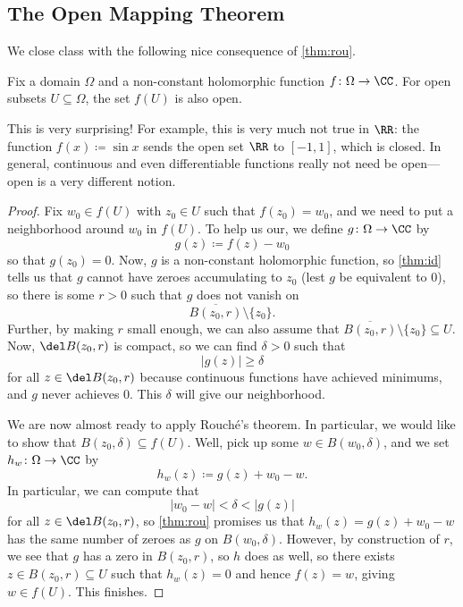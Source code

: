 \subsection{The Open Mapping Theorem}
We close class with the following nice consequence of \autoref{thm:rou}.
\begin{theorem} \label{thm:openmap}
	Fix a domain $\Omega$ and a non-constant holomorphic function $f\colon \Omega\to\CC$. For open subsets $U\subseteq\Omega$, the set $f(U)$ is also open.
\end{theorem}
This is very surprising! For example, this is very much not true in $\RR$: the function $f(x)\coloneqq \sin x$ sends the open set $\RR$ to $[-1,1]$, which is closed. In general, continuous and even differentiable functions really not need be open---open is a very different notion.
\begin{proof}
	Fix $w_0\in f(U)$ with $z_0\in U$ such that $f(z_0)=w_0$, and we need to put a neighborhood around $w_0$ in $f(U)$. To help us our, we define $g\colon \Omega\to\CC$ by
	\[g(z)\coloneqq f(z)-w_0\]
	so that $g(z_0)=0$. Now, $g$ is a non-constant holomorphic function, so \autoref{thm:id} tells us that $g$ cannot have zeroes accumulating to $z_0$ (lest $g$ be equivalent to $0$), so there is some $r>0$ such that $g$ does not vanish on
	\[\overline{B(z_0,r)}\setminus\{z_0\}.\]
	Further, by making $r$ small enough, we can also assume that $\overline{B(z_0,r)}\setminus\{z_0\}\subseteq U$. Now, $\del B(z_0,r)$ is compact, so we can find $\delta>0$ such that
	\[|g(z)|\ge\delta\]
	for all $z\in\del B(z_0,r)$ because continuous functions have achieved minimums, and $g$ never achieves $0$. This $\delta$ will give our neighborhood.

	We are now almost ready to apply Rouch\'e's theorem. In particular, we would like to show that $B(z_0,\delta)\subseteq f(U)$. Well, pick up some $w\in B(w_0,\delta)$, and we set $h_w\colon \Omega\to\CC$ by
	\[h_w(z)\coloneqq g(z)+w_0-w.\]
	In particular, we can compute that
	\[|w_0-w|<\delta<|g(z)|\]
	for all $z\in\del B(z_0,r)$, so \autoref{thm:rou} promises us that $h_w(z)=g(z)+w_0-w$ has the same number of zeroes as $g$ on $B(w_0,\delta)$. However, by construction of $r$, we see that $g$ has a zero in $B(z_0,r)$, so $h$ does as well, so there exists $z\in B(z_0,r)\subseteq U$ such that $h_w(z)=0$ and hence $f(z)=w$, giving $w\in f(U)$. This finishes.
\end{proof}
